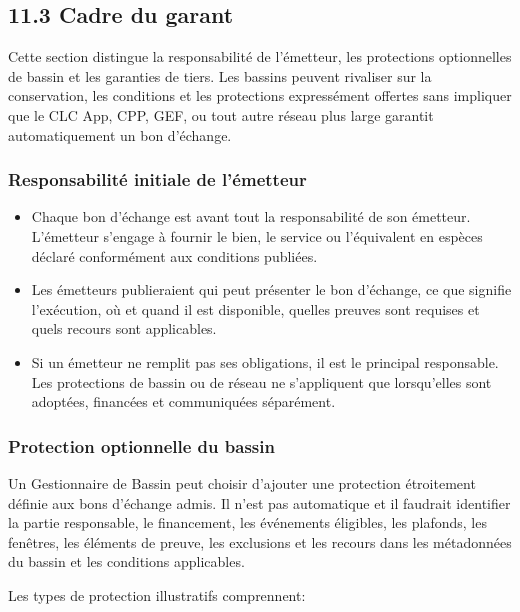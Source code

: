 \documentclass[11pt]{article}
\begin{document}
\subsection*{11.3 Cadre du garant}

Cette section distingue la responsabilité de l'émetteur, les protections optionnelles de bassin et les garanties de tiers. Les bassins peuvent rivaliser sur la conservation, les conditions et les protections expressément offertes sans impliquer que le CLC App, CPP, GEF, ou tout autre réseau plus large garantit automatiquement un bon d'échange.

\subsubsection*{Responsabilité initiale de l'émetteur}

\begin{itemize}[leftmargin=*]
\item Chaque bon d'échange est avant tout la responsabilité de son émetteur. L'émetteur s'engage à fournir le bien, le service ou l'équivalent en espèces déclaré conformément aux conditions publiées.
\item Les émetteurs publieraient qui peut présenter le bon d'échange, ce que signifie l'exécution, où et quand il est disponible, quelles preuves sont requises et quels recours sont applicables.
\item Si un émetteur ne remplit pas ses obligations, il est le principal responsable. Les protections de bassin ou de réseau ne s'appliquent que lorsqu'elles sont adoptées, financées et communiquées séparément.
\end{itemize}
\subsubsection*{Protection optionnelle du bassin}

Un Gestionnaire de Bassin peut choisir d'ajouter une protection étroitement définie aux bons d'échange admis. Il n'est pas automatique et il faudrait identifier la partie responsable, le financement, les événements éligibles, les plafonds, les fenêtres, les éléments de preuve, les exclusions et les recours dans les métadonnées du bassin et les conditions applicables.

Les types de protection illustratifs comprennent:
\end{document}

